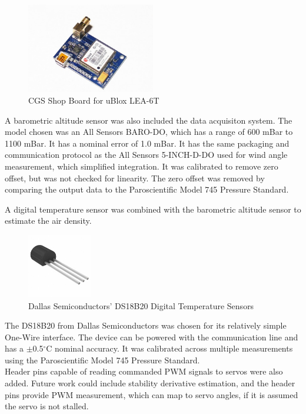 \begin{figure}[H]
  \caption{CGS Shop Board for uBlox LEA-6T} \label{gpsPicture}
  \centering
    \includegraphics[width=0.5\textwidth]{figures/gpsBoard.jpg}
\end{figure}

A barometric altitude sensor was also included the data acquisiton system. The model chosen was an All Sensors BARO-DO, which has a range of 600 mBar to 1100 mBar\cite{allSensorsBaroDatasheet}. It has a nominal error of 1.0 mBar. It has the same packaging and communication protocol as the All Sensors 5-INCH-D-DO used for wind angle measurement, which simplified integration. It was calibrated to remove zero offset, but was not checked for linearity. The zero offset was removed by comparing the output data to the Paroscientific Model 745 Pressure Standard.

A digital temperature sensor was combined with the barometric altitude sensor to estimate the air density.
\begin{figure}[H]
  \caption{Dallas Semiconductors' DS18B20 Digital Temperature Sensors} \label{ds18b20Picture}
  \centering
    \includegraphics[width=0.25\textwidth]{figures/ds18b20Picture.jpg}
\end{figure}
 The DS18B20 from Dallas Semiconductors was chosen for its relatively simple One-Wire interface. The device can be powered with the communication line and has a $\pm$0.5$^\circ$C nominal accuracy\cite{DS18B20Datasheet}. It was calibrated across multiple measurements using the Paroscientific Model 745 Pressure Standard.\\

Header pins capable of reading commanded PWM signals to servos were also added. Future work could include stability derivative estimation, and the header pins provide PWM measurement, which can map to servo angles, if it is assumed the servo is not stalled. 

